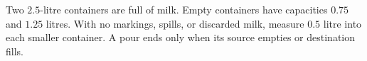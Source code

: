 Two $ 2.5 $-litre containers are full of milk. Empty containers have capacities $ 0.75 $ and $ 1.25 $ litres. With no markings, spills, or discarded milk, measure $ 0.5 $ litre into each smaller container. A pour ends only when its source empties or destination fills.
